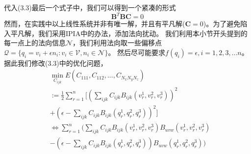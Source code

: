 代入(3.3)最后一个式子中，我们可以得到一个紧凑的形式
$$\mathbf{B}^T \mathbf{B} \mathbf{C} = 0$$
然而，在实践中以上线性系统并非有唯一解，并且有平凡解($\mathbf{C} = 0$)。为了避免陷入平凡解，我们采用IPIA中的办法，添加法向扰动。
我们利用本小节开头提到的每一点上的法向信息$\mathcal{N}$，我们利用法向取一些偏移点$\mathcal{Q} = \{q_i = v_i + \epsilon n_i: v_i \in \mathcal{V}, n_i \in \mathcal{N}\}$。
然后尽可能要求$f(q_i) = \epsilon, i = 1,2,3,...n$。据此我们修改(3.3)中的优化问题，
\begin{equation}
    \begin{split}
        &\min_{C_{ijk}}E(C_{111},C_{112},...,C_{N_xN_yN_z})\\
        &:= \frac{1}{2}\sum_{r = 1}^{n} [ (\sum_{ijk}C_{ijk}B_{ijk}(v_r^1,v_r^2,v_r^3))^2\\
        &+ (\epsilon - \sum_{ijk}C_{ijk}B_{ijk}(q_r^1,q_r^2,q_r^3))^2]\\
        &\Leftrightarrow \sum_{r = 1}^n (\sum_{ijk}C_{ijk} B_{ijk}(v_r^1,v_r^2,v_r^3)B_{uvw}(v_r^1,v_r^2,v_r^3)\\ 
        & - ( \epsilon - \sum_{ijk} C_{ijk}B_{ijk}(q_r^1,q_r^2,q_r^3) )B_{uvw}(q_r^1,q_r^2,q_r^3))
    \end{split}
\end{equation}

